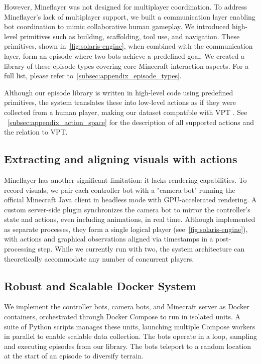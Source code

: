 However, Mineflayer was not designed for multiplayer coordination. To address Mineflayer's lack of multiplayer support, we built a communication layer enabling bot coordination to mimic collaborative human gameplay. We introduced high-level primitives such as building, scaffolding, tool use, and navigation. These primitives, shown in~\cref{fig:solaris-engine}, when combined with the communication layer, form an episode where two bots achieve a predefined goal. We created a library of these episode types covering core Minecraft interaction aspects. For a full list, please refer to~\cref{subsec:appendix_episode_types}.

Although our episode library is written in high-level code using predefined primitives, the system translates these into low-level actions as if they were collected from a human player, making our dataset compatible with VPT \cite{baker2022videopretrainingvptlearning}. See ~\cref{subsec:appendix_action_space} for the description of all supported actions and the relation to VPT.


\subsection{Extracting and aligning visuals with actions}

Mineflayer has another significant limitation: it lacks rendering capabilities. To record visuals, we pair each controller bot with a "camera bot" running the official Minecraft Java client in headless mode with GPU-accelerated rendering. A custom server-side plugin synchronizes the camera bot to mirror the controller's state and actions, even including animations, in real time. Although implemented as separate processes, they form a single logical player (see~\cref{fig:solaris-engine}), with actions and graphical observations aligned via timestamps in a post-processing step. While we currently run with two, the system architecture can theoretically accommodate any number of concurrent players.

\subsection{Robust and Scalable Docker System}
We implement the controller bots, camera bots, and Minecraft server as Docker containers, orchestrated through Docker Compose to run in isolated units. A suite of Python scripts manages these units, launching multiple Compose workers in parallel to enable scalable data collection. The bots operate in a loop, sampling and executing episodes from our library. The bots teleport to a random location at the start of an episode to diversify terrain.

